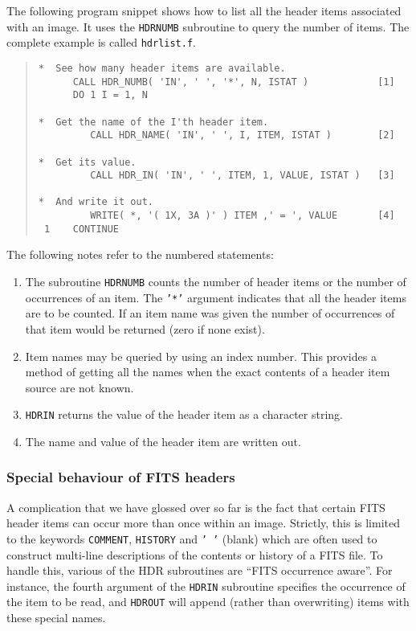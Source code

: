 \documentclass[twoside,11pt]{article}
\newcommand{\htmladdnormallink}[2]{#1}
\newcommand{\htmlref}[2]{#1}
\renewcommand{\_}{\texttt{\symbol{95}}}
\newcommand{\myverb}[1]{{\texttt{#1}}}
\newcommand{\mynote}{The following notes refer to the numbered statements:}
\newenvironment{code}{\begin{small} \begin{quote}}
                     {\end{quote} \end{small}}
\newenvironment{enumnotes}
{
   \renewcommand{\labelenumi}{\myverb{[\theenumi]}}
   \begin{enumerate}
}{
   \end{enumerate}
   \renewcommand{\labelenumi}{\theenumi}
}
\renewenvironment{enumnotes}
  {
    \begin{enumerate}
  }{
    \end{enumerate}
  }
\begin{document}
The following program snippet shows how to list all the header items
associated with an image.
It uses the \htmlref{\myverb{HDR\_NUMB}}{HDR_NUMB} subroutine to query the number of
items. The complete example is called
\htmladdnormallink{\myverb{hdrlist.f}}
{../../bin/examples/img/hdrlist.f}.
\begin{code}
\begin{verbatim}
*  See how many header items are available.
      CALL HDR_NUMB( 'IN', ' ', '*', N, ISTAT )            [1]
      DO 1 I = 1, N

*  Get the name of the I'th header item.
         CALL HDR_NAME( 'IN', ' ', I, ITEM, ISTAT )        [2]

*  Get its value.
         CALL HDR_IN( 'IN', ' ', ITEM, 1, VALUE, ISTAT )   [3]

*  And write it out.
         WRITE( *, '( 1X, 3A )' ) ITEM ,' = ', VALUE       [4]
 1    CONTINUE
\end{verbatim}
\end{code}
\mynote
\begin{enumnotes}
\item
The subroutine \htmlref{\myverb{HDR\_NUMB}}{HDR_NUMB} counts the number of header items
or the number of occurrences of an item. The \myverb{'*'} argument indicates
that all the header items are to be counted. If an
item name was given the number of occurrences of that item would be
returned (zero if none exist).

\item
Item names may be queried by using an index number. This provides a
method of getting all the names when the exact contents of a header
item source are not known.

\item
\htmlref{\myverb{HDR\_IN}}{HDR_INx} returns the value of the header item as a
character string.

\item
The name and value of the header item are written out.
\end{enumnotes}

\subsubsection{Special behaviour of FITS headers}
A complication that we have glossed over so far is the fact that
certain FITS header items can occur more than once within an image.
Strictly, this is limited to the keywords \myverb{COMMENT},
\myverb{HISTORY} and \myverb{' '} (blank) which are often used to
construct multi-line descriptions of the contents or history of a FITS
file. To handle this, various of the HDR subroutines are ``FITS
occurrence aware''. For instance, the fourth argument of the
\htmlref{\myverb{HDR\_IN}}{HDR_INx} subroutine specifies the
occurrence of the item to be read, and
\htmlref{\myverb{HDR\_OUT}}{HDR_OUTx} will append (rather than
overwriting) items with these special names.
\end{document}
